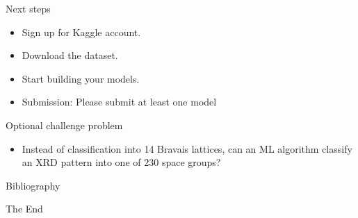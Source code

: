 \documentclass[aspectratio=169]{beamer}
\begin{document}
\begin{frame}{Next steps}
    \begin{itemize}
        \item Sign up for Kaggle account.
        \item Download the dataset.
        \item Start building your models.
        \item Submission: Please submit at least one model
    \end{itemize}
\end{frame}


\begin{frame}{Optional challenge problem}
    \begin{itemize}
        \item Instead of classification into 14 Bravais lattices, can an ML algorithm classify an XRD pattern into one of 230 space groups?
    \end{itemize}
\end{frame}


\begin{frame}{Bibliography}
    
    
\end{frame}


\begin{frame}
    \Huge{\centerline{The End}}
\end{frame}
\end{document}
